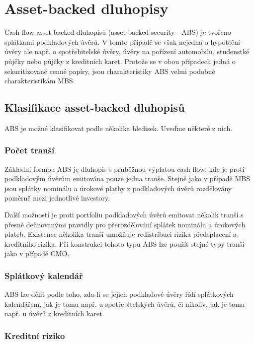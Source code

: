 \documentclass[a4paper]{book}
\begin{document}
\section{Asset-backed dluhopisy}

Cash-flow asset-backed dluhopisů (asset-backed security - ABS) je tvořeno splátkami podkladových úvěrů. V tomto případě se však nejedná o hypoteční úvěry ale např. o spotřebitelské úvěry, úvěry na pořízení automobilu, studenstké půjčky nebo půjčky z kreditních karet. Protože se v obou případech jedná o sekuritizované cenné papíry, jsou charakteristiky ABS velmi podobné charakteristikám MBS.

\subsection{Klasifikace asset-backed dluhopisů}

ABS je možné klasifikovat podle několika hledisek. Uveďme některé z nich.

\subsubsection{Počet tranší}

Základní formou ABS je dluhopis s průběžnou výplatou cash-flow, kde je proti podkladovým úvěrům emitována pouze jedna tranše. Stejně jako v případě MBS jsou splátky nominálu a úrokové platby z podkladových úvěrů rozdělovány poměrně mezi jednotlivé investory.

Další možností je proti portfoliu podkladových úvěrů emitovat několik tranší s přesně definovanými pravidly pro přerozdělování splátek nominálu a úrokových plateb. Existence několika tranší umožňuje redistribuci rizika předsplacení a kreditního rizika. Při konstrukci tohoto typu ABS lze použít stejné typy tranší jako v případě CMO.

\subsubsection{Splátkový kalendář}

ABS lze dělit podle toho, zda-li se jejich podkladové úvěry řídí splátkových kalendářem, jak je tomu např. u spotřebitelských úvěrů, či nikoliv, jak je tomu např. u úvěrů z kreditních karet.

\subsubsection{Kreditní riziko}
\end{document}

